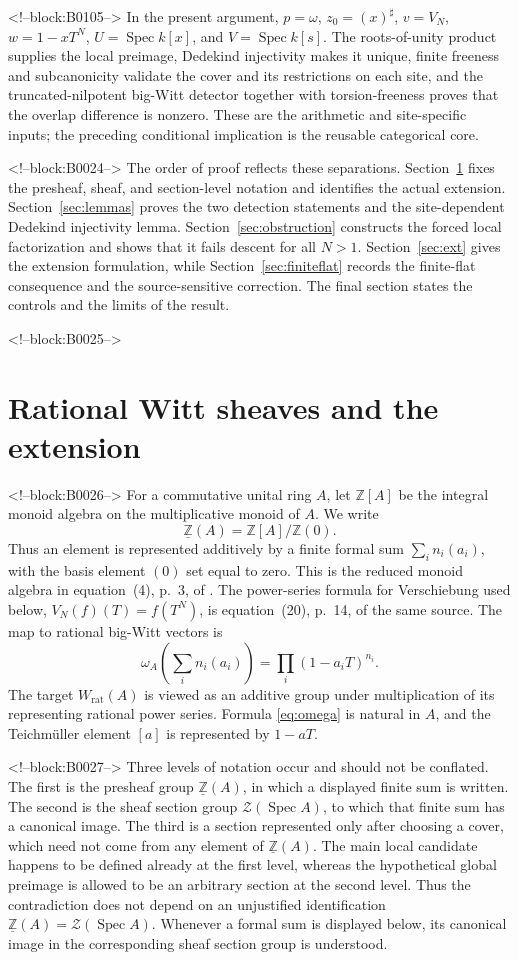 \documentclass[11pt]{article}
\theoremstyle{definition}
\newcommand{\Spec}{\operatorname{Spec}}
\newcommand{\Wrat}{W_{\mathrm{rat}}}
\newcommand{\Zpre}{\underline{\mathbb Z}}
\newcommand{\Zsh}{\mathcal Z}
\newcommand{\sh}{\sharp}
\begin{document}
<!--block:B0105-->
In the present argument, \(p=\omega\), \(z_0=(x)^\sh\),
\(v=V_N\), \(w=1-xT^N\), \(U=\Spec k[x]\), and
\(V=\Spec k[s]\).  The roots-of-unity product supplies the local
preimage, Dedekind injectivity makes it unique, finite freeness and
subcanonicity validate the cover and its restrictions on each site, and
the truncated-nilpotent big-Witt detector together with torsion-freeness
proves that the overlap difference is nonzero.  These are the arithmetic
and site-specific inputs; the preceding conditional implication is the
reusable categorical core.

<!--block:B0024-->
The order of proof reflects these separations.  Section~\ref{sec:objects}
fixes the presheaf, sheaf, and section-level notation and identifies the
actual extension.  Section~\ref{sec:lemmas} proves the two detection
statements and the site-dependent Dedekind injectivity lemma.
Section~\ref{sec:obstruction} constructs the forced local factorization and
shows that it fails descent for all \(N>1\).
Section~\ref{sec:ext} gives the extension formulation, while
Section~\ref{sec:finiteflat} records the finite-flat consequence and the
source-sensitive correction.  The final section states the controls and
the limits of the result.

<!--block:B0025-->
\section{Rational Witt sheaves and the extension}\label{sec:objects}

<!--block:B0026-->
For a commutative unital ring \(A\), let \(\mathbb Z[A]\) be the integral
monoid algebra on the multiplicative monoid of \(A\).  We write
\[
 \Zpre(A)=\mathbb Z[A]/\mathbb Z(0).
\]
Thus an element is represented additively by a finite formal sum
\(\sum_i n_i(a_i)\), with the basis element \((0)\) set equal to zero.
This is the reduced monoid algebra in equation~(4), p.~3, of
\cite{Deninger2025Rational}.  The power-series formula for Verschiebung used
below, \(V_N(f)(T)=f(T^N)\), is equation~(20), p.~14, of the same source.
The map to rational big-Witt vectors is
\[
 \omega_A\!\left(\sum_i n_i(a_i)\right)
   =\prod_i(1-a_iT)^{n_i}.
 \tag{2.1}\label{eq:omega}
\]
The target \(\Wrat(A)\) is viewed as an additive group under multiplication
of its representing rational power series.  Formula
\eqref{eq:omega} is natural in \(A\), and the Teichm\"uller element
\([a]\) is represented by \(1-aT\).

<!--block:B0027-->
Three levels of notation occur and should not be conflated.  The first is
the presheaf group \(\Zpre(A)\), in which a displayed finite sum is written.
The second is the sheaf section group
\(\Zsh(\Spec A)\), to which that finite sum has a canonical image.  The
third is a section represented only after choosing a cover, which need not
come from any element of \(\Zpre(A)\).  The main local candidate happens to
be defined already at the first level, whereas the hypothetical global
preimage is allowed to be an arbitrary section at the second level.  Thus
the contradiction does not depend on an unjustified identification
\(\Zpre(A)=\Zsh(\Spec A)\).
Whenever a formal sum is displayed below, its canonical image in the
corresponding sheaf section group is understood.
\end{document}
